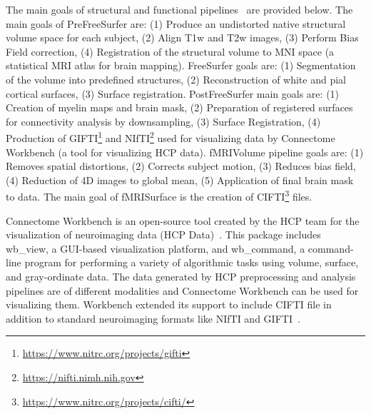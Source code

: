 The main goals of structural and functional pipelines~\cite{Gla13} are provided below. The main goals of PreFreeSurfer are: (1) Produce an undistorted native structural volume space for each subject, (2) Align T1w and T2w images, (3) Perform Bias Field correction, (4) Registration of the structural volume to MNI space (a statistical MRI atlas for brain mapping). FreeSurfer goals are: (1) Segmentation of the volume into predefined structures, (2) Reconstruction of white and pial cortical surfaces, (3) Surface registration. PostFreeSurfer main goals are: (1) Creation of myelin maps and brain mask, (2) Preparation of registered surfaces for connectivity analysis by downsampling, (3) Surface Registration, (4) Production of GIFTI\footnote{\url{https://www.nitrc.org/projects/gifti}} and NIfTI\footnote{\url{https://nifti.nimh.nih.gov}} used for visualizing data by Connectome Workbench (a tool for visualizing HCP data). fMRIVolume pipeline goals are: (1) Removes spatial distortions, (2) Corrects subject motion, (3) Reduces bias field, (4) Reduction of 4D images to global mean, (5) Application of final brain mask to data. The main goal of fMRISurface is the creation of CIFTI\footnote{\url{https://www.nitrc.org/projects/cifti/}} files.

Connectome Workbench is an open-source tool created by the HCP team for the visualization of neuroimaging data (HCP Data)~\cite{wb_workbench}. This package includes wb\_view, a GUI-based visualization platform, and wb\_command, a command-line program for performing a variety of algorithmic tasks using volume, surface, and gray-ordinate data. The data generated by HCP preprocessing and analysis pipelines are of different modalities and Connectome Workbench can be used for visualizing them. Workbench extended its support to include CIFTI file in addition to standard neuroimaging formats like NIfTI and GIFTI~\cite{journals/neuroimage/MarcusHSJWGBABRHHHOMHHRHCSECE13}.
 

